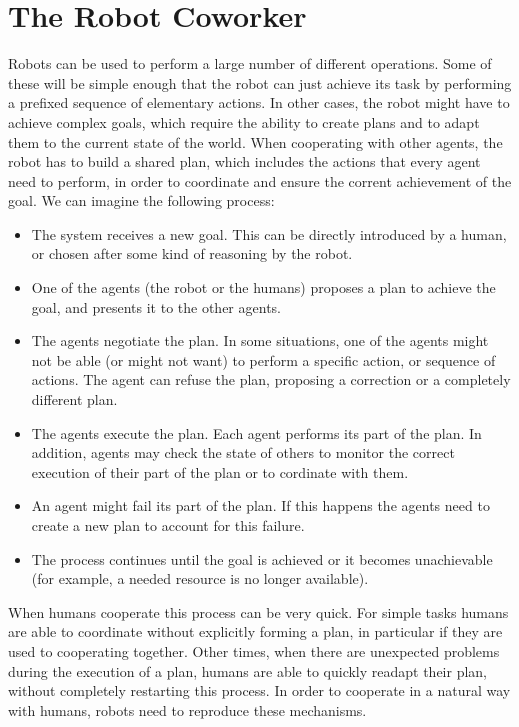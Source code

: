 \part{The Robot Coworker} %

\label{part:robot_coworker} %


Robots can be used to perform a large number of different operations. Some of these will be simple enough that the robot can just achieve its task by performing a prefixed sequence of elementary actions. In other cases, the robot might have to achieve complex goals, which require the ability to create plans and to adapt them to the current state of the world. When cooperating with other agents, the robot has to build a shared plan, which includes the actions that every agent need to perform, in order to coordinate and ensure the corrent achievement of the goal. We can imagine the following process:
\begin{itemize}
	\item The system receives a new goal. This can be directly introduced by a human, or chosen after some kind of reasoning by the robot.
	\item One of the agents (the robot or the humans) proposes a plan to achieve the goal, and presents it to the other agents.
	\item The agents negotiate the plan. In some situations, one of the agents might not be able (or might not want) to perform a specific action, or sequence of actions. The agent can refuse the plan, proposing a correction or a completely different plan.
	\item The agents execute the plan. Each agent performs its part of the plan. In addition, agents may check the state of others to monitor the correct execution of their part of the plan or to cordinate with them.
	\item An agent might fail its part of the plan. If this happens the agents need to create a new plan to account for this failure.
 	\item The process continues until the goal is achieved or it becomes unachievable (for example, a needed resource is no longer available).
\end{itemize}

When humans cooperate this process can be very quick. For simple tasks humans are able to coordinate without explicitly forming a plan, in particular if they are used to cooperating together. Other times, when there are unexpected problems during the execution of a plan, humans are able to quickly readapt their plan, without completely restarting this process. In order to cooperate in a natural way with humans, robots need to reproduce these mechanisms.

